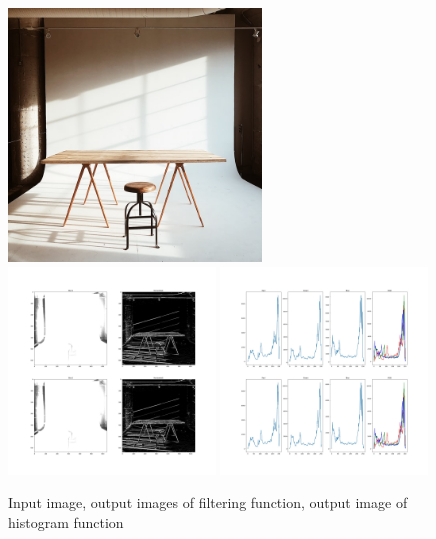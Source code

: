 \documentclass{article}
\begin{document}
{{        \begin{figure}[htp]
            \centering
            \includegraphics[width=0.6\textwidth]{Assignment-4/table.jpg}
            \includegraphics[width=0.49\textwidth]{Assignment-4/filter.jpg}
            \includegraphics[width=0.49\textwidth]{Assignment-4/histogram.jpg}
            \caption{Input image, output images of filtering function, output image of histogram function}
        \end{figure}
    }
}
\clearpage
\end{document}
